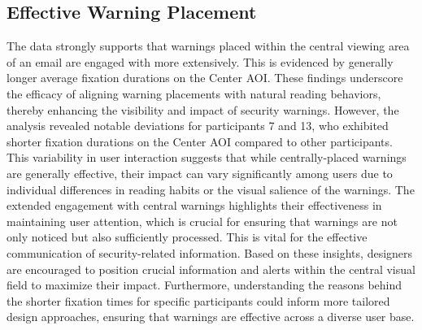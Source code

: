 \documentclass[
  a4paper,  %
  twoside,  %
  bibliography=totoc,
  headsepline,
  cleardoublepage=empty,
  parskip=half,
  draft=false
]{scrbook}
\begin{document}
\subsection{Effective Warning Placement}

The data strongly supports that warnings placed within the central viewing area of an email are engaged with more extensively. This is evidenced by generally longer average fixation durations on the Center AOI. These findings underscore the efficacy of aligning warning placements with natural reading behaviors, thereby enhancing the visibility and impact of security warnings. \newline However, the analysis revealed notable deviations for participants 7 and 13, who exhibited shorter fixation durations on the Center AOI compared to other participants. This variability in user interaction suggests that while centrally-placed warnings are generally effective, their impact can vary significantly among users due to individual differences in reading habits or the visual salience of the warnings. \newline
The extended engagement with central warnings highlights their effectiveness in maintaining user attention, which is crucial for ensuring that warnings are not only noticed but also sufficiently processed. This is vital for the effective communication of security-related information. Based on these insights, designers are encouraged to position crucial information and alerts within the central visual field to maximize their impact. Furthermore, understanding the reasons behind the shorter fixation times for specific participants could inform more tailored design approaches, ensuring that warnings are effective across a diverse user base.
\end{document}
